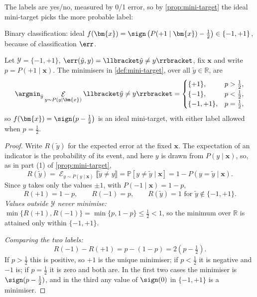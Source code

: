 The labels are yes/no, measured by 0/1 error, so by
\autoref{prop:mini-target} the ideal mini-target picks the more probable
label:

\begin{moral}
    Binary classification: ideal \(f(\bm{x}) = \sign \left( P(+1 \mid \bm{x})
    - \frac{1}{2} \right) \in \left\{ -1, +1 \right\}\), because of
    classification \(\err\).
\end{moral}

\begin{proposition}
    \label{prop:binary-mini-target}
    Let \(\mathcal{Y} = \{-1, +1\}\), \(\err(\tilde{y}, y) = \llbracket
    \tilde{y} \neq y \rrbracket\), fix \(\bm{x}\) and write \(p = P(+1 \mid
    \bm{x})\). The minimisers in \autoref{def:mini-target}, over all
    \(\tilde{y} \in \mathbb{R}\), are
    \[
        \argmin_{\tilde{y}} \mathop{\mathcal{E}}_{y \sim P(y \mid \bm{x})}
        \llbracket \tilde{y} \neq y \rrbracket
        = \begin{cases}
            \{+1\}, & p > \frac{1}{2},\\
            \{-1\}, & p < \frac{1}{2},\\
            \{-1, +1\}, & p = \frac{1}{2},
        \end{cases}
    \]
    so \(f(\bm{x}) = \sign \bigl( p - \frac{1}{2} \bigr)\) is an ideal
    mini-target, with either label allowed when \(p = \frac{1}{2}\).
\end{proposition}

\begin{proof}
    Write \(R(\tilde{y})\) for the expected error at the fixed \(\bm{x}\).
    The expectation of an indicator is the probability of its event, and here
    \(y\) is drawn from \(P(y \mid \bm{x})\), so, as in part (1) of
    \autoref{prop:mini-target},
    \[
        R(\tilde{y})
        = \mathop{\mathcal{E}}_{y \sim P(y \mid \bm{x})}
        \llbracket \tilde{y} \neq y \rrbracket
        = \mathbb{P}[y \neq \tilde{y} \mid \bm{x}]
        = 1 - P(y = \tilde{y} \mid \bm{x}) .
    \]
    Since \(y\) takes only the values \(\pm 1\), with \(P(-1 \mid \bm{x}) = 1
    - p\),
    \[
        R(+1) = 1 - p, \qquad R(-1) = p, \qquad R(\tilde{y}) = 1 \text{ for }
        \tilde{y} \notin \{-1, +1\} .
    \]
    \emph{Values outside \(\mathcal{Y}\) never minimise:} \(\min \{R(+1),
    R(-1)\} = \min\{p, 1 - p\} \le \frac{1}{2} < 1\), so the minimum over
    \(\mathbb{R}\) is attained only within \(\{-1, +1\}\).

    \emph{Comparing the two labels:}
    \[
        R(-1) - R(+1) = p - (1 - p) = 2 \left( p - \tfrac{1}{2} \right) .
    \]
    If \(p > \frac{1}{2}\) this is positive, so \(+1\) is the unique
    minimiser; if \(p < \frac{1}{2}\) it is negative and \(-1\) is; if \(p =
    \frac{1}{2}\) it is zero and both are. In the first two cases the
    minimiser is \(\sign(p - \frac{1}{2})\), and in the third any value of
    \(\sign(0)\) in \(\{-1, +1\}\) is a minimiser.
\end{proof}

